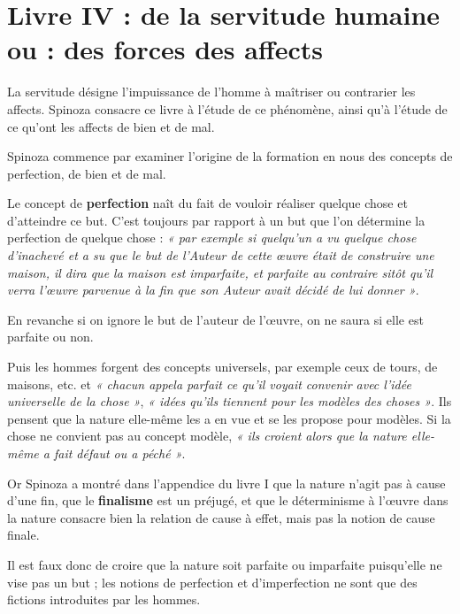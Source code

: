 
\section{Livre IV : de la servitude humaine ou : des forces des affects}

La servitude désigne l’impuissance de l’homme à maîtriser ou contrarier les
affects. Spinoza consacre ce livre à l’étude de ce phénomène, ainsi qu’à
l’étude de ce qu’ont les affects de bien et de mal.

Spinoza commence par examiner l’origine de la formation en nous des concepts
de perfection, de bien et de mal.

Le concept de {\bf perfection} naît du fait de vouloir réaliser quelque chose et
d’atteindre ce but. C’est toujours par rapport à un but que l’on détermine la
perfection de quelque chose : {\it « par exemple si quelqu’un a vu quelque chose
d’inachevé et a su que le but de l’Auteur de cette œuvre était de construire
une maison, il dira que la maison est imparfaite, et parfaite au contraire
sitôt qu’il verra l’œuvre parvenue à la fin que son Auteur avait décidé de
lui donner »}.

En revanche si on ignore le but de l’auteur de l’œuvre, on ne saura si elle
est parfaite ou non.

\vspace{0.5cm}
Puis les hommes forgent des concepts universels, par exemple ceux de tours,
de maisons, etc. et {\it « chacun appela parfait ce qu’il voyait convenir avec
l’idée universelle de la chose »}, {\it « idées qu’ils tiennent pour les modèles des
choses »}. Ils pensent que la nature elle-même les a en vue et se les propose
pour modèles. Si la chose ne convient pas au concept modèle, {\it « ils croient
alors que la nature elle-même a fait défaut ou a péché »}.

Or Spinoza a montré dans l’appendice du livre I que la nature n’agit pas à
cause d’une fin, que le {\bf finalisme} est un préjugé, et que le déterminisme à
l’œuvre dans la nature consacre bien la relation de cause à effet, mais pas
la notion de cause finale.

\vspace{0.5cm}
Il est faux donc de croire que la nature soit parfaite ou imparfaite
puisqu’elle ne vise pas un but ; les notions de perfection et d’imperfection
ne sont que des fictions introduites par les hommes.

